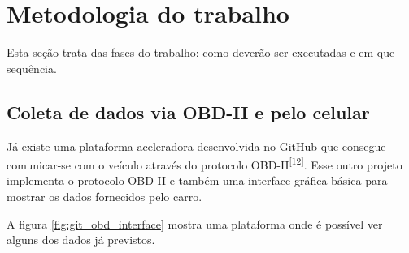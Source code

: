 \chapter{Metodologia do trabalho}
\label{CAP3}

Esta seção trata das fases do trabalho: como deverão ser executadas e em que sequência.



\section{Coleta de dados via OBD-II e pelo celular}
Já existe uma plataforma aceleradora desenvolvida no GitHub que consegue comunicar-se com o veículo através do protocolo OBD-II\textsuperscript{[12]}. Esse outro projeto implementa o protocolo OBD-II e também uma interface gráfica básica para mostrar os dados fornecidos pelo carro.

A figura \ref{fig:git_obd_interface} mostra uma plataforma onde é possível ver alguns dos dados já previstos.

